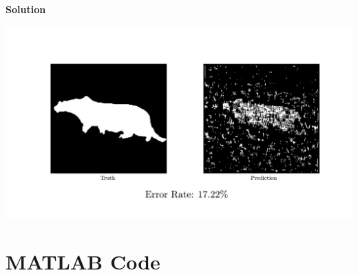 \documentclass{article}
\begin{document}
\textbf{\large Solution}

\begin{center}
  \includegraphics[scale=0.13]{comparison}
\end{center}

\section*{MATLAB Code}
\end{document}
